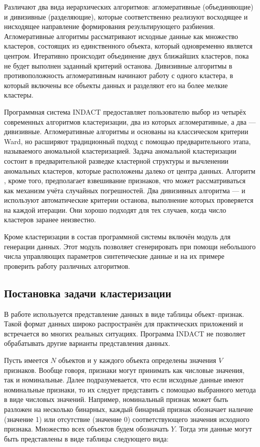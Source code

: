 \documentclass[12pt]{diploma}
\begin{document}
	Различают два вида иерархических алгоритмов: агломеративные (объединяющие) и дивизивные (разделяющие), которые соответственно реализуют восходящее и нисходящее направление формирования результирующего разбиения. Агломеративные алгоритмы рассматривают исходные данные как множество кластеров, состоящих из единственного объекта, который одновременно является центром. Итеративно происходит объединение двух ближайших кластеров, пока не будет выполнен заданный критерий останова. Дивизивные алгоритмы в противоположность агломеративным начинают работу с одного кластера, в который включены все объекты данных и разделяют его на более мелкие кластеры. 
	
	Программная система INDACT предоставляет пользователю выбор из четырёх современных алгоритмов кластеризации, два из которых агломеративные, а два --- дивизивные. Агломеративные алгоритмы \AWard и \AWardpb основаны на классическом критерии Ward, но расширяют традиционный подход с помощью предварительного этапа, называемого аномальной кластеризацией. Задача аномальной кластеризации состоит в предварительной разведке кластерной структуры и вычленении аномальных кластеров, которые расположены далеко от центра данных. Алгоритм \AWardpb, кроме того, предполагает взвешивание признаков, что может рассматриваться как механизм учёта случайных погрешностей. Два дивизивных алгоритма --- \dePDDP и \BiKMR используют автоматические критерии останова, выполнение которых проверяется на каждой итерации. Они хорошо подходят для тех случаев, когда число кластеров заранее неизвестно.
	
	Кроме кластеризации в состав программной системы включён модуль для генерации данных. Этот модуль позволяет сгенерировать при помощи небольшого числа управляющих параметров синтетические данные и на их примере проверить работу различных алгоритмов.

	\subsection{Постановка задачи кластеризации}
	В  работе используется представление данных в виде таблицы объект--признак. Такой формат данных широко распространён для практических приложений и встречается во многих реальных ситуациях. Программа INDACT не позволяет обрабатывать другие варианты представления данных. 
	
	Пусть имеется $ N $ объектов и у каждого объекта определены значения $ V $ признаков. Вообще говоря, признаки могут принимать как числовые значения, так и номинальные. Далее подразумевается, что если исходные данные имеют номинальные признаки, то их следует представить с помощью выбранного метода в виде числовых значений. Например, номинальный признак может быть разложен на несколько бинарных, каждый бинарный признак обозначает наличие (значение 1) или отсутствие (значение 0) соответствующего значения исходного признака.
	Множество всех объектов будем обозначать $ Y $. Тогда эти данные могут быть представлены в виде таблицы следующего вида:
	
\end{document}

